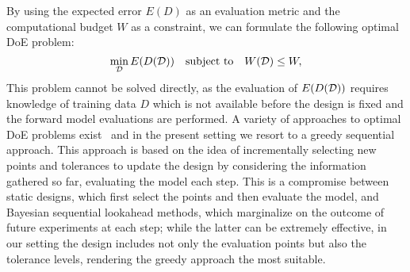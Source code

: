 By using the expected error $E(D)$ as an evaluation metric and the computational budget $W$ as a constraint, we can formulate the following optimal DoE problem:
\begin{equation} \label{prob:doe}
    \min_{\mathcal D} E(D(\mathcal D)) \quad \text{subject to} \quad W(\mathcal D) \le W,
\end{equation}
This problem cannot be solved directly, as the evaluation of $E(D(\mathcal D))$ requires knowledge of training data $D$ which is not available before the design is fixed and the forward model evaluations are performed.
A variety of approaches to optimal DoE problems exist~\cite{HuanJagalurMarzouk2024} and in the present setting we resort to a greedy sequential approach. 
This approach is based on the idea of incrementally selecting new points and tolerances to update the design by considering the information gathered so far, evaluating the model each step. \newline
This is a compromise between static designs, which first select the points and then evaluate the model, and Bayesian sequential lookahead methods, which marginalize on the outcome of future experiments at each step; while the latter can be extremely effective, in our setting the design includes not only the evaluation points but also the tolerance levels, rendering the greedy approach the most suitable. \medbreak

